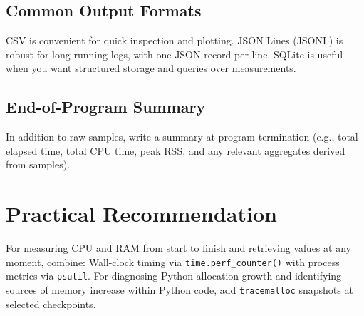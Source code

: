 \documentclass{article}
\begin{document}
        \subsection{Common Output Formats}
            CSV is convenient for quick inspection and plotting.
            JSON Lines (JSONL) is robust for long-running logs, with one JSON record per line.
            SQLite is useful when you want structured storage and queries over measurements.
        
        \subsection{End-of-Program Summary}
            In addition to raw samples, write a summary at program termination (e.g., total elapsed time, total CPU time, peak RSS, and any relevant aggregates derived from samples).
    
    
    \section{Practical Recommendation}
        For measuring CPU and RAM from start to finish and retrieving values at any moment, combine:
        Wall-clock timing via \texttt{time.perf\_counter()} with process metrics via \texttt{psutil}.
        For diagnosing Python allocation growth and identifying sources of memory increase within Python code, add \texttt{tracemalloc} snapshots at selected checkpoints.
\end{document}

